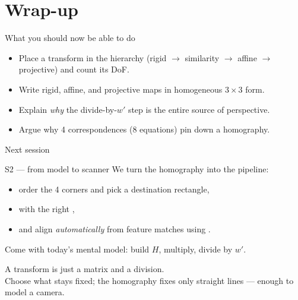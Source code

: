 \documentclass[10pt,aspectratio=169]{beamer}
\begin{document}
\section{Wrap-up}

\begin{frame}{What you should now be able to do}
  \begin{itemize}
    \item Place a transform in the hierarchy (rigid $\to$ similarity $\to$ affine $\to$ projective) and count its DoF.
    \item Write rigid, affine, and projective maps in homogeneous $3\times3$ form.
    \item Explain \emph{why} the divide-by-$w'$ step is the entire source of perspective.
    \item Argue why 4 correspondences (8 equations) pin down a homography.
  \end{itemize}
\end{frame}

\begin{frame}{Next session}
  \begin{alertblock}{S2 — from model to scanner}
    We turn the homography into the  pipeline:
    \begin{itemize}
      \item order the 4 corners and pick a destination rectangle,
      \item {} with the right ,
      \item and align \emph{automatically} from feature matches using .
    \end{itemize}
  \end{alertblock}
  Come with today's mental model: build $H$, multiply, divide by $w'$.
\end{frame}

\begin{frame}[standout]
  A transform is just a matrix and a division.\\[4pt]
  \normalsize Choose what stays fixed; the homography fixes only straight lines — enough to model a camera.
\end{frame}
\end{document}
